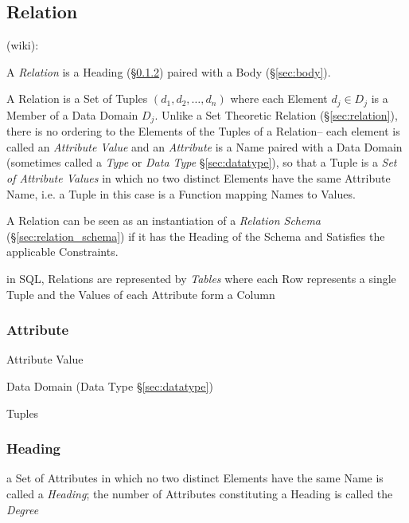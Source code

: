 \subsection{Relation}\label{sec:database_relation}

(wiki):

A \emph{Relation} is a Heading (\S\ref{sec:heading}) paired with a Body
(\S\ref{sec:body}).

A Relation is a Set of Tuples $(d_1, d_2, \ldots, d_n)$ where each Element $d_j
\in D_j$ is a Member of a Data Domain $D_j$. Unlike a Set Theoretic Relation
(\S\ref{sec:relation}), there is no ordering to the Elements of the Tuples of a
Relation-- each element is called an \emph{Attribute Value} and an
\emph{Attribute} is a Name paired with a Data Domain (sometimes called a
\emph{Type} or \emph{Data Type} \S\ref{sec:datatype}), so that a Tuple is a
\emph{Set of Attribute Values} in which no two distinct Elements have the same
Attribute Name, i.e. a Tuple in this case is a Function mapping Names to
Values.

A Relation can be seen as an instantiation of a \emph{Relation Schema}
(\S\ref{sec:relation_schema}) if it has the Heading of the Schema and Satisfies
the applicable Constraints.

in SQL, Relations are represented by \emph{Tables} where each Row represents a
single Tuple and the Values of each Attribute form a Column



\subsubsection{Attribute}\label{sec:database_attribute}

Attribute Value

Data Domain (Data Type \S\ref{sec:datatype})

Tuples



\subsubsection{Heading}\label{sec:heading}

a Set of Attributes in which no two distinct Elements have the same Name is
called a \emph{Heading}; the number of Attributes constituting a Heading is
called the \emph{Degree}



